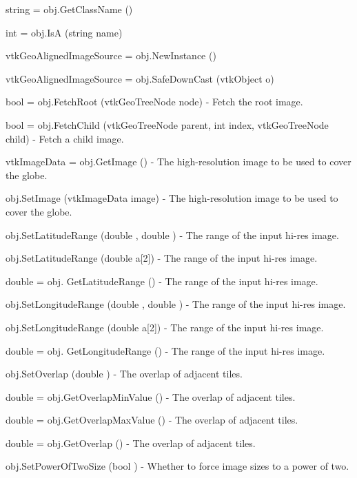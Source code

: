 \begin{DoxyItemize}
\item {\ttfamily string = obj.\-Get\-Class\-Name ()}  
\item {\ttfamily int = obj.\-Is\-A (string name)}  
\item {\ttfamily vtk\-Geo\-Aligned\-Image\-Source = obj.\-New\-Instance ()}  
\item {\ttfamily vtk\-Geo\-Aligned\-Image\-Source = obj.\-Safe\-Down\-Cast (vtk\-Object o)}  
\item {\ttfamily bool = obj.\-Fetch\-Root (vtk\-Geo\-Tree\-Node node)} -\/ Fetch the root image.  
\item {\ttfamily bool = obj.\-Fetch\-Child (vtk\-Geo\-Tree\-Node parent, int index, vtk\-Geo\-Tree\-Node child)} -\/ Fetch a child image.  
\item {\ttfamily vtk\-Image\-Data = obj.\-Get\-Image ()} -\/ The high-\/resolution image to be used to cover the globe.  
\item {\ttfamily obj.\-Set\-Image (vtk\-Image\-Data image)} -\/ The high-\/resolution image to be used to cover the globe.  
\item {\ttfamily obj.\-Set\-Latitude\-Range (double , double )} -\/ The range of the input hi-\/res image.  
\item {\ttfamily obj.\-Set\-Latitude\-Range (double a\mbox{[}2\mbox{]})} -\/ The range of the input hi-\/res image.  
\item {\ttfamily double = obj. Get\-Latitude\-Range ()} -\/ The range of the input hi-\/res image.  
\item {\ttfamily obj.\-Set\-Longitude\-Range (double , double )} -\/ The range of the input hi-\/res image.  
\item {\ttfamily obj.\-Set\-Longitude\-Range (double a\mbox{[}2\mbox{]})} -\/ The range of the input hi-\/res image.  
\item {\ttfamily double = obj. Get\-Longitude\-Range ()} -\/ The range of the input hi-\/res image.  
\item {\ttfamily obj.\-Set\-Overlap (double )} -\/ The overlap of adjacent tiles.  
\item {\ttfamily double = obj.\-Get\-Overlap\-Min\-Value ()} -\/ The overlap of adjacent tiles.  
\item {\ttfamily double = obj.\-Get\-Overlap\-Max\-Value ()} -\/ The overlap of adjacent tiles.  
\item {\ttfamily double = obj.\-Get\-Overlap ()} -\/ The overlap of adjacent tiles.  
\item {\ttfamily obj.\-Set\-Power\-Of\-Two\-Size (bool )} -\/ Whether to force image sizes to a power of two.  

\end{DoxyItemize}
